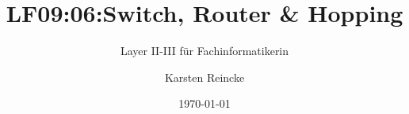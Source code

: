 \documentclass[]{beamer}
\title{LF09:06:Switch, Router \& Hopping }
\subtitle{Layer II-III für Fachinformatikerin}
\institute[GS-LDK]{Gewerbliche Schulen Dillenburg}
\author{Karsten Reincke}
\date{\today}
\def\cfgGl{../../../cfg.gl/}
\begin{document}

\begin{frame}
  \titlepage

  
\end{frame}






\logo{}
\newpage



%
\end{document}
